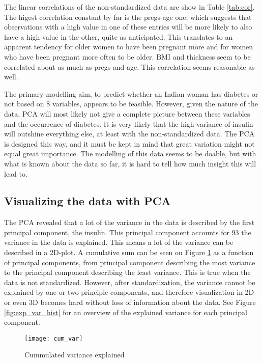 The linear correlations of the non-standardized data are show in Table \ref{tab:cor}.
The higest correlation constant by far is the pregs-age one, which suggests
that observations with a high value in one of these entries will be more likely
to also have a high value in the other, quite as anticipated. This translates to
an apparent tendency for older women to have been pregnant more and for women
who have been pregnant more often to be older.
BMI and thickness seem to be correlated about as much as pregs and age. This
correlation seems reasonable as well.

The primary modelling aim, to predict whether an Indian woman has diabetes or not
based on 8 variables, appears to be feasible. However, given the nature of the
data, PCA will most likely not give a complete picture between these variables
and the occurrence of diabetes. It is very likely that the high variance of
insulin will outshine everything else, at least with the non-standardized
data. The PCA is designed this way, and it must be kept in mind that great
variation might not equal great importance.
The modelling of this data seems to be doable, but with what is known about the data
so far, it is hard to tell how much insight this will lead to.

\subsection{Visualizing the data with PCA}
The PCA revealed that a lot of the variance in the data is described by the
first principal component, the insulin. This principal component accounts for
93%
the variance in the data is explained. This means a lot of the variance can
be described in a 2D-plot. A cumulative sum can be seen on Figure \ref{fig:cumvar} as a
function of principal components, from principal component describing the most
variance to the principal component describing the least variance. This is true
when the data is not standardized. However, after standardization, the variance
cannot be explained by one or two principle components, and therefore visualization
in 2D or even 3D becomes hard without loss of information about the data. See
Figure \ref{fig:exp_var_hist} for an overview of the explained variance for each principal component.

\begin{figure}
  \centering{}
  \texttt{[image: cum\_var]}
  \caption{Cummulated variance explained}\label{fig:cumvar}
\end{figure}

